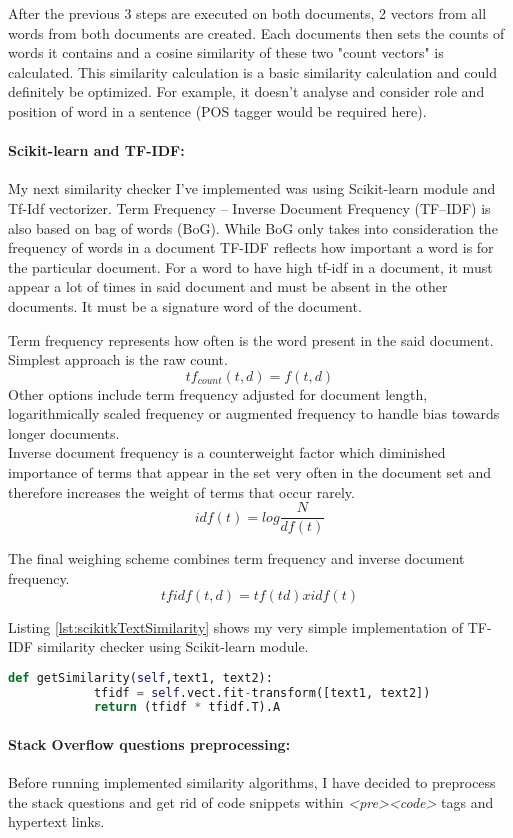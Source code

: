 After the previous 3 steps are executed on both documents, 2 vectors from all words from both documents are created. Each documents then sets the counts of words it contains and a cosine similarity of these two "count vectors" is calculated. This similarity calculation is a basic similarity calculation and could definitely be optimized. For example, it doesn't analyse and consider role and position of word in a sentence (POS tagger would be required here). 

\paragraph{Scikit-learn and TF-IDF:}My next similarity checker I've implemented was using Scikit-learn module and Tf-Idf vectorizer. Term Frequency – Inverse Document Frequency (TF–IDF) is also based on bag of words (BoG). While BoG only takes into consideration the frequency of words in a document TF-IDF reflects how important a word is for the particular document. For a word to have high tf-idf in a document, it must appear a lot of times in said document and must be absent in the other documents. It must be a signature word of the document.

Term frequency represents how often is the word present in the said document. Simplest approach is the raw count.
\[ tf_{count}(t,d) = f(t,d) \]
Other options include term frequency adjusted for document length, logarithmically scaled frequency or augmented frequency to handle bias towards longer documents.\\
Inverse document frequency is a counterweight factor which 
diminished importance of terms that appear in the set very often in the document set and therefore increases the weight of terms that occur rarely.
\[ idf(t) = log \frac{N}{df(t)} \]

The final weighing scheme combines term frequency and inverse document frequency.
\[ tfidf(t,d) = tf(td) x idf(t)		\]

Listing \ref{lst:scikitkTextSimilarity} shows my very simple implementation of TF-IDF similarity checker using Scikit-learn module.

\begin{lstlisting}[caption={Text similarity implementation with Scikit using Tf-Idf model},label={lst:scikitkTextSimilarity},language=Python]
		def getSimilarity(self,text1, text2):
			tfidf = self.vect.fit-transform([text1, text2])
			return (tfidf * tfidf.T).A
\end{lstlisting}

\paragraph{Stack Overflow questions preprocessing:} Before running implemented similarity algorithms, I have decided to preprocess the stack questions and get rid of code snippets within \textit{\textless pre\textgreater\textless code\textgreater} tags and hypertext links.

	